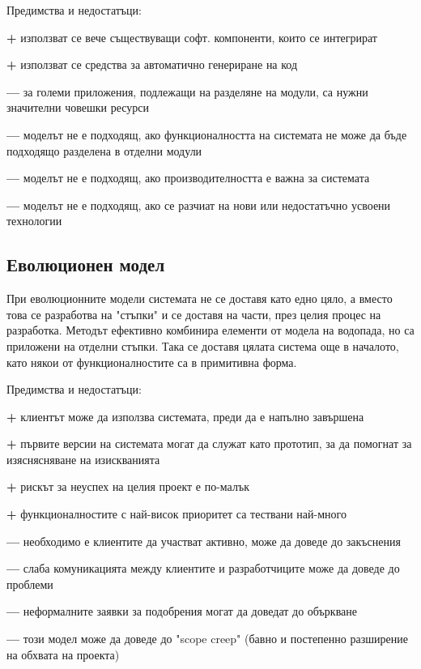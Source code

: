 \documentclass[fleqn,12pt]{article}
\begin{document}
Предимства и недостатъци:
\begin{description}
	\item \textbf{+} използват се вече съществуващи софт. компоненти, които се интегрират
	\item \textbf{+} използват се средства за автоматично генериране на код
	\item \textbf{---} за големи приложения, подлежащи на разделяне на модули, са нужни значителни човешки ресурси
	\item \textbf{---} моделът не е подходящ, ако функционалността на системата не може да бъде подходящо разделена в отделни модули
	\item \textbf{---} моделът не е подходящ, ако производителността е важна за системата
	\item \textbf{---} моделът не е подходящ, ако се разчиат на нови или недостатъчно усвоени технологии
\end{description}

\subsection{Еволюционен модел}
При еволюционните модели системата не се доставя като едно цяло, а вместо това се разработва на "стъпки" и се доставя на части, през целия процес на разработка. Методът ефективно комбинира елементи от модела на водопада, но са приложени на отделни стъпки. Така се доставя цялата система още в началото, като някои от функционалностите са в примитивна форма.

Предимства и недостатъци:
\begin{description}
	\item \textbf{+} клиентът може да използва системата, преди да е напълно завършена
	\item \textbf{+} първите версии на системата могат да служат като прототип, за да помогнат за изяснясняване на изискванията
	\item \textbf{+} рискът за неуспех на целия проект е по-малък
	\item \textbf{+} функционалностите с най-висок приоритет са тествани най-много
	\item \textbf{---} необходимо е клиентите да участват активно, може да доведе до закъснения
	\item \textbf{---} слаба комуникацията между клиентите и разработчиците може да доведе до проблеми  
	\item \textbf{---} неформалните заявки за подобрения могат да доведат до объркване
	\item \textbf{---} този модел може да доведе до "scope creep" (бавно и постепенно разширение на обхвата на проекта)
\end{description}
\end{document}
